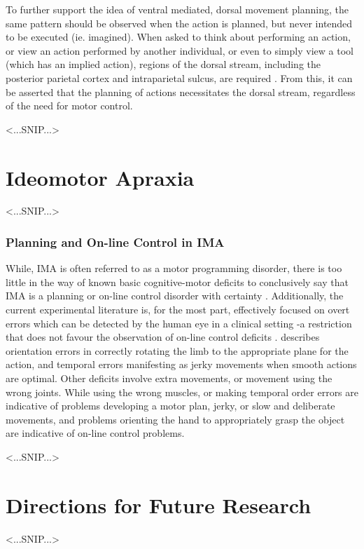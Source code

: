 To further support the idea of ventral mediated, dorsal movement planning, the same pattern should be observed when the action is planned, but never intended to be executed (ie. imagined). When asked to think about performing an action, or view an action performed by another individual, or even to simply view a tool (which has an implied action), regions of the dorsal stream, including the posterior parietal cortex and intraparietal sulcus, are required \cite<For a review, see>{culham2006hpc}. From this, it can be asserted that the planning of actions necessitates the dorsal stream, regardless of the need for motor control.

<...SNIP...>  %



\section*{Ideomotor Apraxia}
<...SNIP...>  %



\subsubsection*{Planning and On-line Control in IMA}
While, IMA is often referred to as a motor programming disorder, there is too little in the way of known basic cognitive-motor deficits to conclusively say that IMA is a planning or on-line control disorder with certainty \cite{harrington}. Additionally, the current experimental literature is, for the most part, effectively focused on overt errors which can be detected by the human eye in a clinical setting -a restriction that does not favour the observation of on-line control deficits \cite{harrington}.  describes orientation errors in correctly rotating the limb to the appropriate plane for the action, and temporal errors manifesting as jerky movements when smooth actions are optimal. Other deficits involve extra movements, or movement using the wrong joints. While using the wrong muscles, or making temporal order errors are indicative of problems developing a motor plan, jerky, or slow and deliberate movements, and problems orienting the hand to appropriately grasp the object are indicative of on-line control problems.

<...SNIP...>  %


\section*{Directions for Future Research}
<...SNIP...>  %